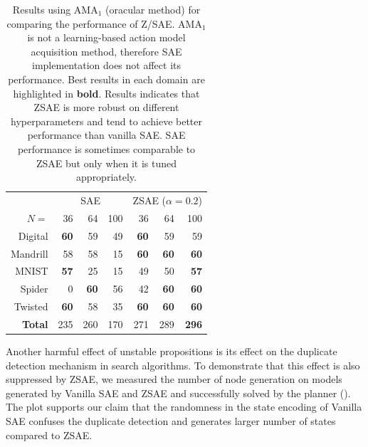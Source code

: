 \begin{table}[htbp]
\centering
\begin{tabular}{r|rrr|rrr}
 & \multicolumn{3}{c|}{SAE} & \multicolumn{3}{c}{ZSAE ($\alpha=0.2$)} \\ 
$N=$           & {36}        & {64}        & {100} & {36}        & {64}        & {100}        \\\hline
Digital        & \textbf{60} & 59          & 49    & \textbf{60} & 59          & 59           \\
Mandrill       & 58          & 58          & 15    & \textbf{60} & \textbf{60} & \textbf{60}  \\
MNIST          & \textbf{57} & 25          & 15    & 49          & 50          & \textbf{57}  \\
Spider         & 0           & \textbf{60} & 56    & 42          & \textbf{60} & \textbf{60}  \\
Twisted        & \textbf{60} & 58          & 35    & \textbf{60} & \textbf{60} & \textbf{60}  \\\hline
\textbf{Total} & {235}       & {260}       & {170} & {271}       & {289}       & \textbf{296} \\
\end{tabular}
\caption{Results using AMA$_1$ (oracular method) for comparing the performance of Z/SAE.
AMA$_1$ is not a learning-based action model acquisition method, therefore SAE implementation does not affect its performance.
Best results in each domain are highlighted in \textbf{bold}.
Results indicates that ZSAE is more robust on different hyperparameters and tend to achieve better performance than vanilla SAE.
SAE performance is sometimes comparable to ZSAE but only when it is tuned appropriately.
}
\label{tab:ama1}
\end{table}

Another harmful effect of unstable propositions is
its effect on the duplicate detection mechanism in search algorithms.
To demonstrate that this effect is also suppressed by ZSAE,
we measured the number of node generation
on models generated by Vanilla SAE and ZSAE and successfully solved by
the planner ().
The plot supports our claim that
the randomness in the state encoding of Vanilla SAE confuses the duplicate detection and
generates larger number of states compared to ZSAE.


